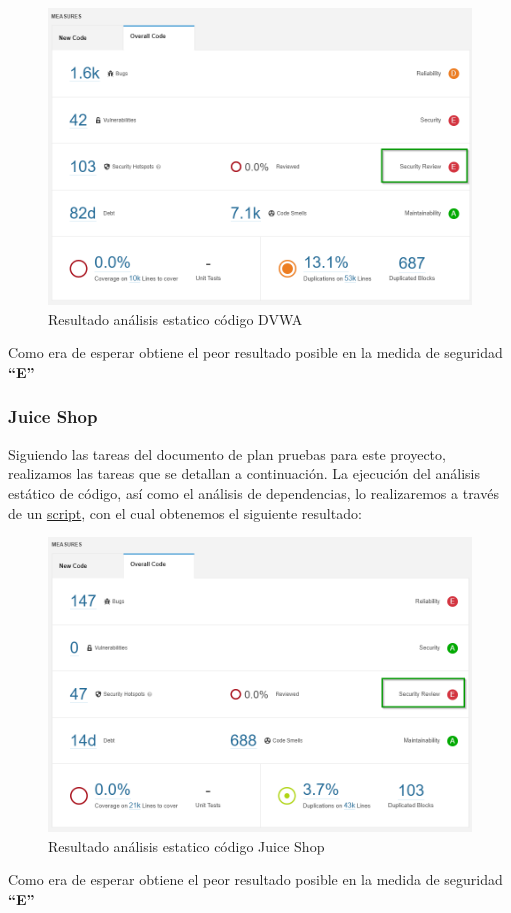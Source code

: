 \begin{figure}[h!]  
    \includegraphics[width=\linewidth]{./imagenes/07_AnalisisEstatico__DVWA.png}
    \caption{Resultado análisis estatico código DVWA}  
    \label{fig:7}
\end{figure}
Como era de esperar obtiene el peor resultado posible en la medida de seguridad \textbf{“E”}

\subsubsection{Juice Shop}
Siguiendo las tareas del documento de plan pruebas para este proyecto, realizamos las tareas que se detallan a continuación.
La ejecución del análisis estático de código, así como el análisis de dependencias, lo realizaremos a través de un 
\href{https://github.com/M0l1n3ta/PFG/blob/master/Scripts/STAT/RunSonarScaner_JuiceShop.ps1}{script}, con el cual obtenemos 
el siguiente resultado:

\begin{figure}[h!]  
    \includegraphics[width=\linewidth]{./imagenes/08_AnalisisEstatico_JuiceShop.png}
    \caption{Resultado análisis estatico código Juice Shop}  
    \label{fig:8}
\end{figure}
Como era de esperar obtiene el peor resultado posible en la medida de seguridad \textbf{“E”}

